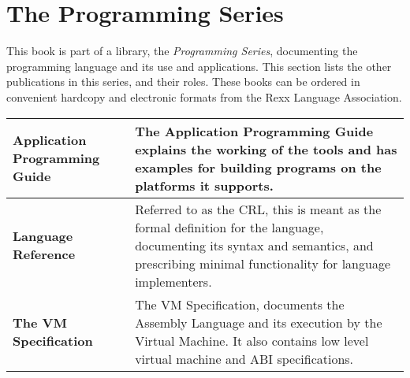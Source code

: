 \chapter{The \crexx{} Programming Series}
This book is part of a library, the \emph{\crexx{} Programming Series}, documenting the \crexx{} programming language and its use and applications. This section lists the other publications in this series, and their roles. These books can be ordered in convenient hardcopy and electronic formats from the Rexx Language Association.
\newline
\newline
\begin{tabularx}{\textwidth}{>{\bfseries}lX}
\toprule
Application Programming Guide & The Application Programming Guide
explains the working of the tools and has examples for building
programs on the platforms it supports.
\\\midrule
Language Reference & Referred to as the CRL, this is meant as the formal definition for the language, documenting its syntax and semantics, and prescribing minimal functionality for language implementers.
\\\midrule
The \crexx{} VM Specification & The \crexx{} VM
Specification, documents the \crexx{} Assembly Language and its execution
by the \crexx{} Virtual Machine. It also contains low level virtual
machine and ABI specifications.
\\\bottomrule
\end{tabularx}
